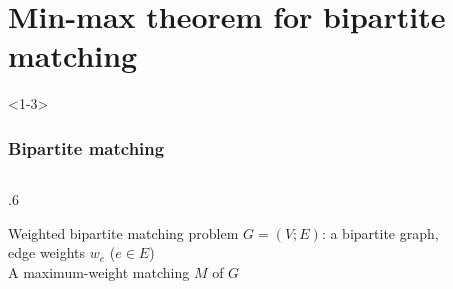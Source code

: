 \documentclass[14pt,aspectratio=169,xcolor=dvipsnames,table,onlytextwidth]{beamer}
\begin{document}
\section{Min-max theorem for bipartite matching}
\begin{frame}<1-3>
    \frametitle{Bipartite matching}

    \small
    \begin{columns}[T]
    \begin{column}{.6\textwidth}
        \begin{block}{Weighted bipartite matching problem}
             $G=(V; E)$: a bipartite graph, \\ edge weights $w_e$ ($e \in E$) \\
             A maximum-weight matching $M$ of $G$
        \end{block}



\end{column}
\end{columns}
\end{frame}
\end{document}
